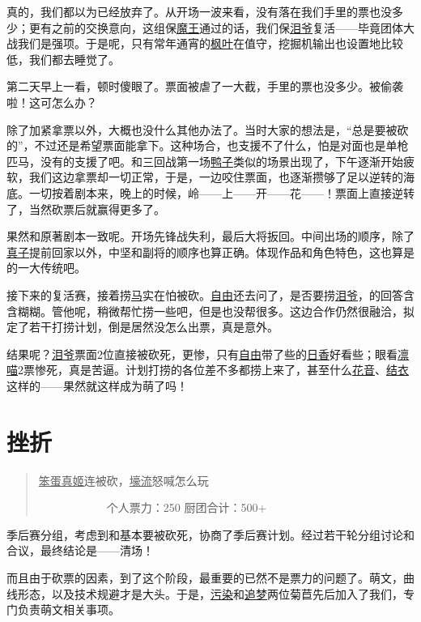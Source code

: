 真的，我们都以为已经放弃了。从开场一波来看，没有落在我们手里的票也没多少；更有之前的交换意向，这组保\uline{魔王}通过的话，我们保\uline{\uline{泪爷}}复活——毕竟团体大战我们是强项。于是呢，只有常年通宵的\uline{枫叶}在值守，挖掘机输出也设置地比较低，我们都去睡觉了。

第二天早上一看，顿时傻眼了。票面被虐了一大截，手里的票也没多少。被偷袭啦！这可怎么办？

除了加紧拿票以外，大概也没什么其他办法了。当时大家的想法是，“总是要被砍的”，不过还是希望票面能拿下。这种场合，也支援不了什么，怕是对面也是单枪匹马，没有的支援了吧。和三回战第一场\uline{鸭子}类似的场景出现了，下午逐渐开始疲软，我们这边拿票却一切正常，于是，一边咬住票面，也逐渐攒够了足以逆转的海底。一切按着剧本来，晚上的时候，岭——上——开——花——！票面上直接逆转了，当然砍票后就赢得更多了。

果然和原著剧本一致呢。开场先锋战失利，最后大将扳回。中间出场的顺序，除了\uline{真子}提前回家以外，中坚和副将的顺序也算正确。体现作品和角色特色，这也算是的一大传统吧。

接下来的复活赛，接着捞\uline{马}实在怕被砍。\uline{自由}还去问了，是否要捞\uline{\uline{泪爷}}，的回答含含糊糊。管他呢，稍微帮忙捞一些吧，但是也没帮很多。这边合作仍然很融洽，拟定了若干打捞计划，倒是居然没怎么出票，真是意外。

结果呢？\uline{泪爷}票面2位直接被砍死，更惨，只有\uline{自由}带了些的\uline{日香}好看些；眼看\uline{凛喵}2票惨死，真是苦逼。计划打捞的各位差不多都捞上来了，甚至什么\uline{花音}、\uline{结衣}这样的——果然就这样成为萌了吗！

\chapter{挫折}
\begin{quote}
\uline{笨蛋}\uline{真姬}连被砍，\uline{壕流}怒喊怎么玩

　　　　　　个人票力：250 厨团合计：500+
\end{quote}

季后赛分组，考虑到和基本要被砍死，协商了季后赛计划。经过若干轮分组讨论和合议，最终结论是——清场！

而且由于砍票的因素，到了这个阶段，最重要的已然不是票力的问题了。萌文，曲线形态，以及技术规避才是大头。于是，\uline{污染}和\uline{追梦}两位菊苣先后加入了我们，专门负责萌文相关事项。

